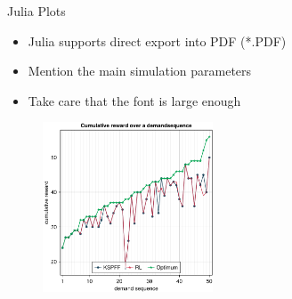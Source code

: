 \documentclass[english,american,german,aspectratio=43]{beamer}
\begin{document}
\begin{frame}{Julia Plots}

  \begin{itemize}
    \item Julia supports direct export into PDF ({*}.PDF)
    \item Mention the main simulation parameters
    \item Take care that the font is large enough
  \end{itemize}
  \begin{figure}
    \includegraphics[width=0.45\textwidth]{img/rewards_unscaled.pdf}
  \end{figure}

\end{frame}
\end{document}
